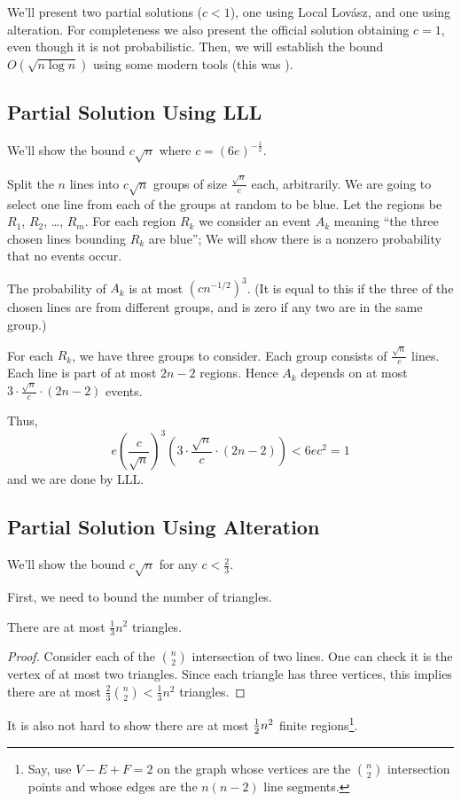 \documentclass[11pt]{scrartcl}
\begin{document}
We'll present two partial solutions ($c < 1$), one using Local Lov\'asz, and one using alteration.
For completeness we also present the official solution obtaining $c=1$, even though it is not probabilistic.
Then, we will establish the bound $O(\sqrt{n \log n})$ using some modern tools (this was \cite{potalk}).

\subsection{Partial Solution Using LLL}
We'll show the bound $c \sqrt n$ where $c = (6e)^{-\frac12}$.

Split the $n$ lines into $c \sqrt n$
groups of size $\frac{\sqrt n}{c}$ each, arbitrarily.
We are going to select one line from each of the groups at random to be blue.
Let the regions be $R_1$, $R_2$, \dots, $R_m$.
For each region $R_k$ we consider an event $A_k$ meaning
``the three chosen lines bounding $R_k$ are blue'';
We will show there is a nonzero probability that no events occur.

The probability of $A_k$ is at most $\left( cn^{-1/2} \right)^3$.
(It is equal to this if the three of the chosen lines are from different groups,
and is zero if any two are in the same group.)

For each $R_k$, we have three groups to consider.
Each group consists of $\frac{\sqrt n}{c}$ lines.
Each line is part of at most $2n-2$ regions.
Hence $A_k$ depends on at most $3 \cdot \frac{\sqrt n}{c} \cdot (2n-2)$ events.

Thus,
\[ e \left( \frac{c}{\sqrt n} \right)^3 \left( 3 \cdot \frac{\sqrt{n}}{c} \cdot (2n-2) \right)
  < 6ec^2 = 1 \]
and we are done by LLL.

\subsection{Partial Solution Using Alteration}
We'll show the bound $c \sqrt n$ for any $c < \frac 23$.

First, we need to bound the number of triangles.
\begin{claim*}
  There are at most $\frac 13 n^2$ triangles.
\end{claim*}
\begin{proof}
  Consider each of the $\binom n2$ intersection of two lines.
  One can check it is the vertex of at most two triangles.
  Since each triangle has three vertices,
  this implies there are at most $\frac 23 \binom n2 < \frac{1}{3} n^2$ triangles.
\end{proof}
It is also not hard to show there are at most $\frac{1}{2} n^2$ finite regions\footnote{Say,
use $V-E+F=2$ on the graph whose vertices are the $\binom n2$ intersection
points and whose edges are the $n(n-2)$ line segments.}.
\end{document}
